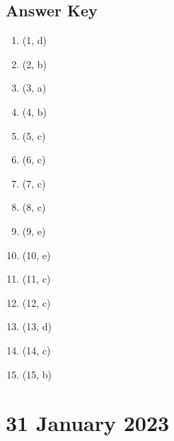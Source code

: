 \documentclass[a4paper,11pt,oneside]{book}
\begin{document}
\clearpage
\section{Answer Key}

\begin{enumerate}
    \item (1, d)
    \item (2, b)
    \item (3, a)
    \item (4, b)
    \item (5, c)
    \item (6, c)
    \item (7, c)
    \item (8, c)
    \item (9, e)
    \item (10, e)
    \item (11, c)
    \item (12, c)
    \item (13, d)
    \item (14, c)
    \item (15, b)
\end{enumerate}



\chapter{31 January 2023}
\end{document}
